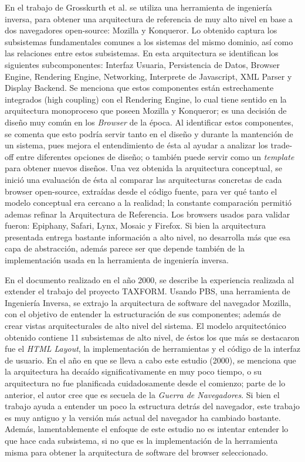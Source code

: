 En el trabajo de Grosskurth et al. \cite{2005-grosskurth-browser-refarch, preprint-grosskurth-browser-archevol} se utiliza una herramienta de ingeniería inversa, para obtener una arquitectura de referencia de muy alto nivel en base a dos navegadores open-source: Mozilla y Konqueror. Lo obtenido captura los subsistemas fundamentales comunes a los sistemas del mismo dominio, así como las relaciones entre estos subsistemas. En esta arquitectura se identifican los siguientes subcomponentes: Interfaz Usuaria, Persistencia de Datos, Browser Engine, Rendering Engine, Networking, Interprete de Javascript, XML Parser y Display Backend. Se menciona que estos componentes están estrechamente integrados (high coupling) con el Rendering Engine, lo cual tiene sentido en la arquitectura monoproceso que poseen Mozilla y Konqueror; es una decisión de diseño muy común en los \textit{Browser} de la época. Al identificar estos componentes, se comenta que esto podría servir tanto en el diseño y durante la mantención de un sistema, pues mejora el entendimiento de ésta al ayudar a analizar los trade-off entre diferentes opciones de diseño; o también puede servir como un \textit{template} para obtener nuevos diseños. Una vez obtenida la arquitectura conceptual, se inició una evaluación de ésta al comparar las arquitecturas concretas de cada browser open-source, extraídas desde el código fuente, para ver qué tanto el modelo conceptual era cercano a la realidad; la constante comparación permitió ademas refinar la Arquitectura de Referencia. Los browsers usados para validar fueron: Epiphany, Safari, Lynx, Mosaic y Firefox. Si bien la arquitectura presentada entrega bastante información a alto nivel, no desarrolla más que esa capa de abstracción, además parece ser que depende también de la implementación usada en la herramienta de ingeniería inversa. 


En el documento \cite{Godfrey2000} realizado en el año 2000, se describe la experiencia realizada al extender el trabajo del proyecto TAXFORM. Usando PBS, una herramienta de Ingeniería Inversa, se extrajo la arquitectura de software del navegador Mozilla, con el objetivo de entender la estructuración de sus componentes; además de crear vistas arquitecturales de alto nivel del sistema. El modelo arquitectónico obtenido contiene 11 subsistemas de alto nivel, de éstos los que más se destacaron fue el \textit{HTML Layout}, la implementación de herramientas y el código de la interfaz de usuario. En el año en que se lleva a cabo este estudio (2000), se menciona que la arquitectura ha decaído significativamente en muy poco tiempo, o su arquitectura no fue planificada cuidadosamente desde el comienzo; parte de lo anterior, el autor cree que es secuela de la \textit{Guerra de Navegadores}. Si bien el trabajo ayuda a entender un poco la estructura detrás del navegador, este trabajo es muy antiguo y la versión más actual del navegador ha cambiado bastante. Además, lamentablemente el enfoque de este estudio no es intentar entender lo que hace cada subsistema, si no que es la implementación de la herramienta misma para obtener la arquitectura de software del browser seleccionado.

